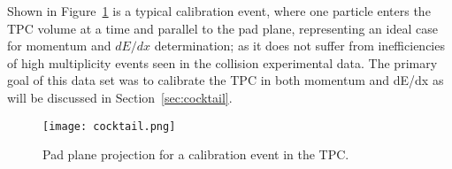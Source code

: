 Shown in Figure~\ref{fig:cocktail} is a typical calibration event, where one particle enters the TPC volume at a time and parallel to the pad plane, representing an ideal case for momentum and $dE/dx$ determination; as it does not suffer from inefficiencies of high multiplicity events seen in the collision experimental data. The primary goal of this data set was to calibrate the TPC in both momentum and dE/dx as will be discussed in Section~\ref{sec:cocktail}. 

\begin{figure}[!htb]
\centering
\texttt{[image: cocktail.png]}
\caption{Pad plane projection for a calibration event in the TPC.}
\label{fig:cocktail}
\end{figure}


